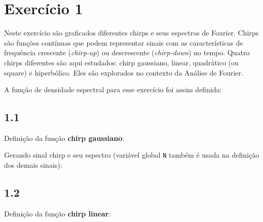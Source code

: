 
\section*{\large Exercício 1}
%

Neste exercício são graficados diferentes chirps e seus espectros de Fourier. Chirps são funções contínuas que podem representar sinais com as características de frequência crescente (\textit{chirp-up}) ou descrescente (\textit{chirp-down}) no tempo. Quatro chirps diferentes são aqui estudados: chirp gaussiano, linear, quadrático (ou square) e hiperbólico. Eles são explorados no contexto da Análise de Fourier. %

A função de densidade espectral para esse exercício foi assim definida:








\subsection*{1.1} 
%
Definição da função \textbf{chirp gaussiano}:


Gerando sinal chirp e seu espectro (variável global \texttt{N} também é usada na definição dos demais sinais):


\subsection*{1.2}
%
Definição da função \textbf{chirp linear}:


